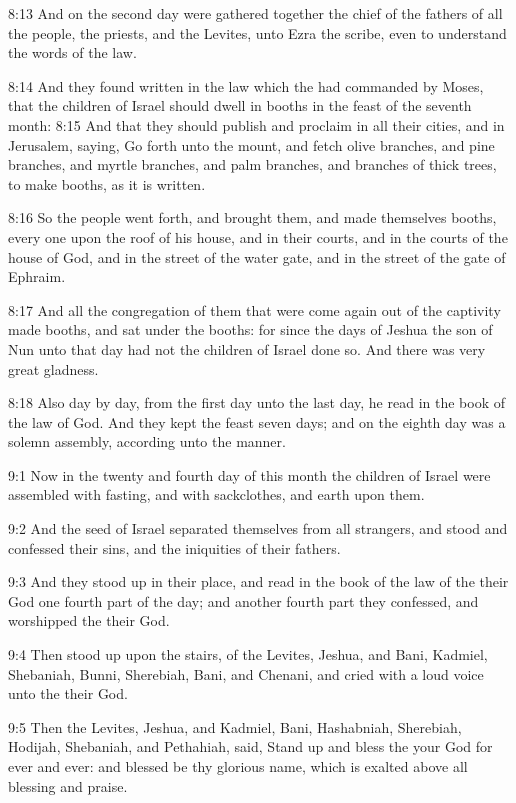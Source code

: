 8:13 And on the second day were gathered together the chief of the
fathers of all the people, the priests, and the Levites, unto Ezra the
scribe, even to understand the words of the law.

8:14 And they found written in the law which the \LORD had commanded by
Moses, that the children of Israel should dwell in booths in the feast
of the seventh month: 8:15 And that they should publish and proclaim
in all their cities, and in Jerusalem, saying, Go forth unto the
mount, and fetch olive branches, and pine branches, and myrtle
branches, and palm branches, and branches of thick trees, to make
booths, as it is written.

8:16 So the people went forth, and brought them, and made themselves
booths, every one upon the roof of his house, and in their courts, and
in the courts of the house of God, and in the street of the water
gate, and in the street of the gate of Ephraim.

8:17 And all the congregation of them that were come again out of the
captivity made booths, and sat under the booths: for since the days of
Jeshua the son of Nun unto that day had not the children of Israel
done so. And there was very great gladness.

8:18 Also day by day, from the first day unto the last day, he read in
the book of the law of God. And they kept the feast seven days; and on
the eighth day was a solemn assembly, according unto the manner.

9:1 Now in the twenty and fourth day of this month the children of
Israel were assembled with fasting, and with sackclothes, and earth
upon them.

9:2 And the seed of Israel separated themselves from all strangers,
and stood and confessed their sins, and the iniquities of their
fathers.

9:3 And they stood up in their place, and read in the book of the law
of the \LORD their God one fourth part of the day; and another fourth
part they confessed, and worshipped the \LORD their God.

9:4 Then stood up upon the stairs, of the Levites, Jeshua, and Bani,
Kadmiel, Shebaniah, Bunni, Sherebiah, Bani, and Chenani, and cried
with a loud voice unto the \LORD their God.

9:5 Then the Levites, Jeshua, and Kadmiel, Bani, Hashabniah,
Sherebiah, Hodijah, Shebaniah, and Pethahiah, said, Stand up and bless
the \LORD your God for ever and ever: and blessed be thy glorious name,
which is exalted above all blessing and praise.

